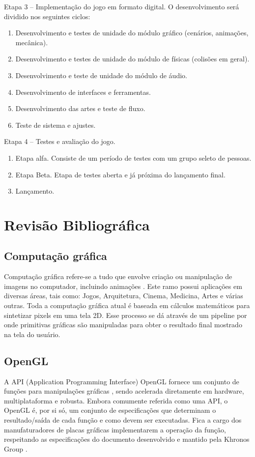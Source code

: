 \documentclass[12pt, 
openright, 
oneside, 
a4paper,    
brazil]{facom-ufu-abntex2}
\begin{document}
Etapa 3 – Implementação do jogo em formato digital. O desenvolvimento será dividido nos seguintes ciclos:
\begin{enumerate}
\item Desenvolvimento e testes de unidade do módulo gráfico
(cenários, animações, mecânica).
\item Desenvolvimento e testes de unidade do módulo de físicas
(colisões em geral).
\item Desenvolvimento e teste de unidade do módulo de áudio.
\item Desenvolvimento de interfaces e ferramentas.
\item Desenvolvimento das artes e teste de fluxo.
\item Teste de sistema e ajustes.
\end{enumerate}
Etapa 4 – Testes e avaliação do jogo.
\begin{enumerate}
\item Etapa alfa. Consiste de um período de testes com um grupo seleto de pessoas.
\item Etapa Beta. Etapa de testes aberta e já próxima do lançamento final.
\item Lançamento.
\end{enumerate}
\fi



\chapter{Revisão Bibliográfica}


\label{sec:refteo}
\section{Computação gráfica}
Computação gráfica refere-se a tudo que envolve criação ou manipulação de imagens no computador, incluindo animações \cite{ComputerGraphicsIntro}. Este ramo possui aplicações em diversas áreas, tais como: Jogos, Arquitetura, Cinema, Medicina, Artes e várias outras. Toda a computação gráfica atual é baseada em cálculos matemáticos para sintetizar pixels em uma tela 2D. Esse processo se dá através de um pipeline por onde primitivas gráficas são manipuladas para obter o resultado final mostrado na tela do usuário.
\section{OpenGL}
A API (Application Programming Interface) OpenGL fornece um conjunto de funções para manipulações gráficas \cite{LearnOpenGL}, sendo acelerada diretamente em hardware, multiplataforma e robusta. Embora comumente referida como uma API, o OpenGL é, por si só, um conjunto de especificações que determinam o resultado/saída de cada função e como devem ser executadas. Fica a cargo dos manufaturadores de placas gráficas implementarem a operação da função, respeitando as especificações do documento desenvolvido e mantido pela Khronos Group \cite{KhronosOpenGLSpecification}.
\end{document}
